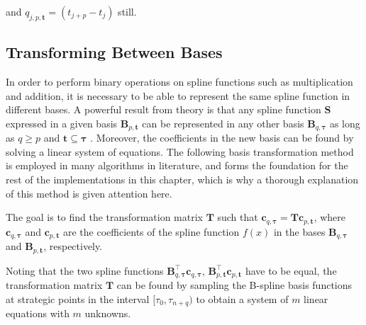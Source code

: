 and $q_{j,p,\mathbf{t}} = (t_{j+p}-t_j)$ still.


\subsection{Transforming Between Bases}\label{sec:basis-transformation}
In order to perform binary operations on spline functions such as multiplication and addition, it is necessary to be able to represent the same spline function in different bases. A powerful result from theory is that any spline function $\mathbf S$ expressed in a given basis $\mathbf B_{p,\mathbf t}$ can be represented in any other basis $\mathbf B_{q,\boldsymbol \tau}$ as long as $q \geq p$ and $\mathbf t \subseteq \boldsymbol \tau$ \citep{Grimstad2016}. Moreover, the coefficients in the new basis can be found by solving a linear system of equations. The following basis transformation method is employed in many algorithms in literature, and forms the foundation for the rest of the implementations in this chapter, which is why a thorough explanation of this method is given attention here.

The goal is to find the transformation matrix $\mathbf T$ such that $\mathbf c_{q, \boldsymbol \tau} = \mathbf T \mathbf c_{p, \mathbf t}$, where $\mathbf c_{q, \boldsymbol \tau}$ and $\mathbf c_{p, \mathbf t}$ are the coefficients of the spline function $f(x)$ in the bases $\mathbf B_{q,\boldsymbol \tau}$ and $\mathbf B_{p,\mathbf t}$, respectively.

Noting that the two spline functions $\mathbf B_{q,\boldsymbol \tau}^\top \mathbf c_{q, \boldsymbol \tau}$, $\mathbf B_{p,\mathbf t}^\top \mathbf c_{p, \mathbf t}$ have to be equal,
the transformation matrix $\mathbf T$ can be found by sampling the B-spline basis functions at strategic points in the interval $[\tau_0, \tau_{n+q})$ to obtain a system of $m$ linear equations with $m$ unknowns.

